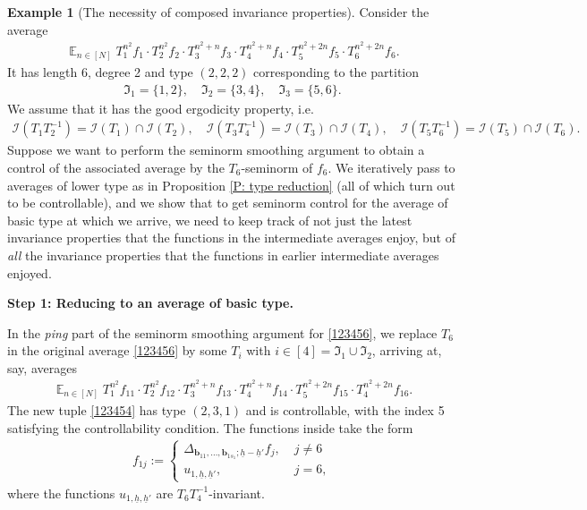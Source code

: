 \documentclass[11pt]{amsart}
\theoremstyle{definition}
\newtheorem{example}{Example}
\newcommand{\CI}{{\mathcal I}}
\newcommand{\FI}{{\mathfrak I}}
\renewcommand{\b}{{\textbf{b}}}
\newcommand{\uh}{{\underline{h}}}
\newcommand{\inv}{^{-1}}
\DeclareMathOperator*{\E}{\mathbb{E}}
\begin{document}
\begin{example}[The necessity of composed invariance properties]\label{Ex: 6 tuple}
Consider the average
\begin{align}\label{123456}
    \E_{n\in[N]}T_1^{n^2}f_1 \cdot T_2^{n^2}f_2\cdot T_3^{n^2+n}f_3\cdot T_4^{n^2+n}f_4 \cdot T_5^{n^2+2n}f_5\cdot T_6^{n^2+2n}f_6.
\end{align}
It has length $6$, degree 2 and type $(2,2,2)$ corresponding to the partition
\begin{align*}
    \FI_1 =\{1, 2\},\quad \FI_2 = \{3, 4\}, \quad \FI_3 = \{5, 6\}.
\end{align*}
We assume that it has the good ergodicity property, i.e.
\begin{align*}
    \CI(T_1 T_2\inv) = \CI(T_1)\cap\CI(T_2),\quad \CI(T_3 T_4\inv) = \CI(T_3)\cap \CI(T_4), \quad  \CI(T_5 T_6\inv) =\CI(T_5)\cap \CI(T_6).
\end{align*}
Suppose we want to perform the seminorm smoothing argument to obtain a control of the associated average by the $T_6$-seminorm of $f_6$. We iteratively pass to averages of lower type as in Proposition \ref{P: type reduction} (all of which turn out to be controllable), and we show that to get seminorm control for the average of basic type at which we arrive, we need to keep track of not just the latest invariance properties that the functions in the intermediate averages enjoy, but of \textit{all} the invariance properties that the functions in earlier intermediate averages enjoyed.

\smallskip
\textbf{Step 1: Reducing to an average of basic type.}
\smallskip

In the \textit{ping} part of the seminorm smoothing argument for \eqref{123456}, we replace $T_6$ in the original average \eqref{123456} by some $T_i$ with $i\in[4]=\FI_1\cup\FI_2$, arriving at, say, averages
\begin{align}\label{123454}
    \E_{n\in[N]}T_1^{n^2}f_{11} \cdot T_2^{n^2}f_{12}\cdot T_3^{n^2+n}f_{13}\cdot T_4^{n^2+n}f_{14} \cdot T_5^{n^2+2n}f_{15}\cdot T_4^{n^2+2n}f_{16}.
\end{align}
The new tuple \eqref{123454} has type $(2,3,1)$ and is controllable, with the index 5 satisfying the controllability condition. The functions inside take the form
\begin{align*}
    f_{1j} := \begin{cases}
    \Delta_{\b_{11}, \ldots, \b_{1s_1}; \uh-\uh'}f_{j},\; & j \neq 6\\
    u_{1,\uh, \uh'},\; &j=6,
    \end{cases}
\end{align*}
where the functions $u_{1, \uh, \uh'}$ are $T_6 T_4^{-1}$-invariant.


\end{example}
\end{document}
